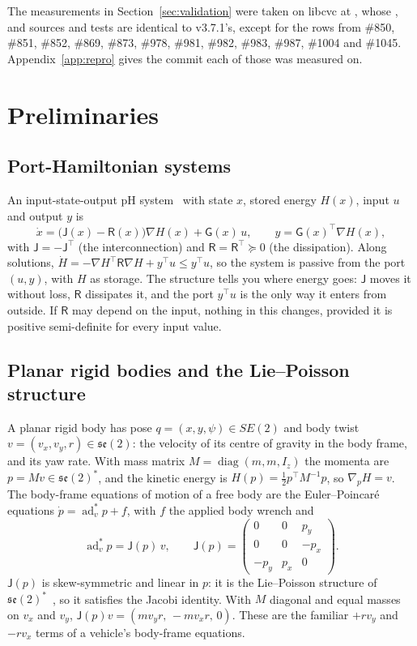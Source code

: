 \documentclass[11pt]{article}
\theoremstyle{remark}
\newcommand{\J}{\mathsf J}
\newcommand{\R}{\mathsf R}
\newcommand{\G}{\mathsf G}
\newcommand{\T}{^{\top}}
\newcommand{\se}{\mathfrak{se}(2)}
\begin{document}
The measurements in Section~\ref{sec:validation} were taken on libcvc  at
, whose ,  and  sources and tests are identical to
v3.7.1's, except for the rows from \#850, \#851, \#852, \#869, \#873, \#978, \#981, \#982, \#983,
\#987, \#1004 and \#1045.
Appendix~\ref{app:repro} gives the commit each of those was measured on.

\section{Preliminaries}
\label{sec:prelim}

\subsection{Port-Hamiltonian systems}
An input-state-output pH system~\cite{vanderschaft2014pht} with state $x$, stored energy $H(x)$,
input $u$ and output $y$ is
\begin{equation}
  \dot x=\big(\J(x)-\R(x)\big)\nabla H(x)+\G(x)\,u,\qquad y=\G(x)\T\nabla H(x),
  \label{eq:ph}
\end{equation}
with $\J=-\J\T$ (the interconnection) and $\R=\R\T\succeq0$ (the dissipation). Along solutions,
$\dot H=-\nabla H\T\R\nabla H+y\T u\le y\T u$, so the system is passive from the port $(u,y)$, with
$H$ as storage. The structure tells you where energy goes: $\J$ moves it without loss, $\R$
dissipates it, and the port $y\T u$ is the only way it enters from outside. If $\R$ may depend on
the input, nothing in this changes, provided it is positive semi-definite for every input value.

\subsection{Planar rigid bodies and the Lie--Poisson structure}
A planar rigid body has pose $q=(x,y,\psi)\in SE(2)$ and body twist $v=(v_x,v_y,r)\in\se$: the
velocity of its centre of gravity in the body frame, and its yaw rate. With mass matrix
$M=\operatorname{diag}(m,m,I_z)$ the momenta are $p=Mv\in\se^*$, and the kinetic energy is
$H(p)=\tfrac12p\T M^{-1}p$, so $\nabla_pH=v$. The body-frame equations of motion of a free body are
the Euler--Poincar\'e equations $\dot p=\operatorname{ad}^*_vp+f$, with $f$ the applied body
wrench and
\begin{equation}
  \operatorname{ad}^*_vp=\J(p)\,v,\qquad
  \J(p)=\begin{pmatrix}0&0&p_y\\0&0&-p_x\\-p_y&p_x&0\end{pmatrix}.
  \label{eq:J}
\end{equation}
$\J(p)$ is skew-symmetric and linear in $p$: it is the Lie--Poisson structure of
$\se^*$~\cite{marsden1999}, so it satisfies the Jacobi identity. With $M$ diagonal and equal
masses on $v_x$ and $v_y$, $\J(p)v=(mv_yr,\,-mv_xr,\,0)$. These are the familiar $+rv_y$ and $-rv_x$
terms of a vehicle's body-frame equations.
\end{document}
